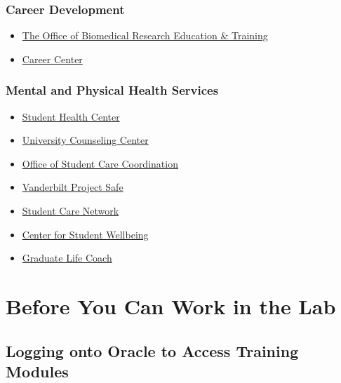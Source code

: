 \documentclass[
]{book}
\begin{document}
\hypertarget{career-development}{%
\subsection{Career Development}\label{career-development}}

\begin{itemize}
\item
  \href{https://medschool.vanderbilt.edu/bret/resources/}{The Office of Biomedical Research Education \& Training}
\item
  \href{https://www.vanderbilt.edu/career/}{Career Center}
\end{itemize}

\hypertarget{mental-and-physical-health-services}{%
\subsection{Mental and Physical Health Services}\label{mental-and-physical-health-services}}

\begin{itemize}
\item
  \href{https://www.vumc.org/student-health/welcome}{Student Health Center}
\item
  \href{https://www.vanderbilt.edu/ucc/}{University Counseling Center}
\item
  \href{https://www.vanderbilt.edu/carecoordination/}{Office of Student Care Coordination}
\item
  \href{https://www.vanderbilt.edu/projectsafe/}{Vanderbilt Project Safe}
\item
  \href{https://www.vanderbilt.edu/studentcarenetwork/}{Student Care Network}
\item
  \href{https://www.vanderbilt.edu/healthydores/}{Center for Student Wellbeing}
\item
  \href{https://gradschool.vanderbilt.edu/current_students/gradlife.php}{Graduate Life Coach}
\end{itemize}

\hypertarget{training}{%
\chapter{Before You Can Work in the Lab}\label{training}}

\hypertarget{logging-onto-oracle-to-access-training-modules}{%
\section{Logging onto Oracle to Access Training Modules}\label{logging-onto-oracle-to-access-training-modules}}
\end{document}
